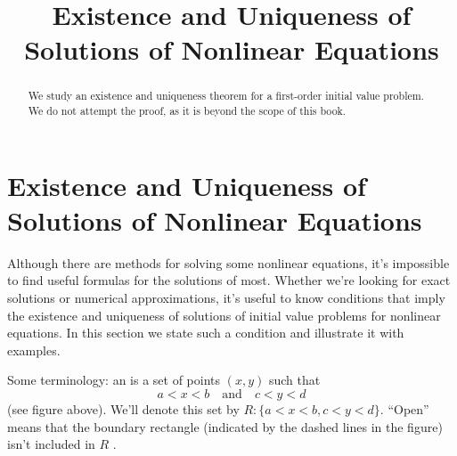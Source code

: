 \documentclass{ximera}
\title{Existence and Uniqueness of Solutions of Nonlinear Equations}%
\begin{document}
\begin{abstract}
We study  an existence and uniqueness theorem for a first-order initial value problem.  We do not attempt the proof, as it is beyond the scope of this book.
\end{abstract}

\maketitle

\section*{Existence and Uniqueness of Solutions of Nonlinear Equations}

Although  there are  methods for
 solving some nonlinear equations, it's
impossible to find  useful formulas for the solutions of most.
Whether we're looking for  exact solutions or numerical
approximations, it's useful to know  conditions that imply the
existence and uniqueness of solutions of initial value problems for
nonlinear equations. In this section we state  such a condition and
illustrate it with examples.





Some terminology:
 an 
 is a set of points $(x,y)$ such that
$$
a<x<b\quad\mbox{and}\quad c<y<d
$$
 (see figure above).  We'll denote this set by
$R:  \{ a < x < b, c < y < d \}$.
 ``Open'' means that the
boundary rectangle (indicated by the dashed lines in
the figure) isn't  included in  $R$ .
\end{document}
